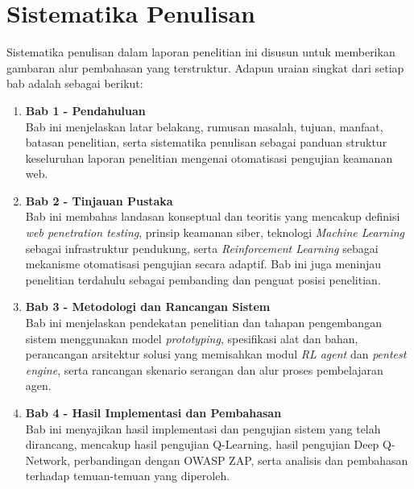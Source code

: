 \section{Sistematika Penulisan}

Sistematika penulisan dalam laporan penelitian ini disusun untuk memberikan gambaran alur pembahasan yang terstruktur. Adapun uraian singkat dari setiap bab adalah sebagai berikut:

\begin{enumerate}
    \item \textbf{Bab 1 - Pendahuluan} \\
    Bab ini menjelaskan latar belakang, rumusan masalah, tujuan, manfaat, batasan penelitian, serta sistematika penulisan sebagai panduan struktur keseluruhan laporan penelitian mengenai otomatisasi pengujian keamanan web.

    \item \textbf{Bab 2 - Tinjauan Pustaka} \\
    Bab ini membahas landasan konseptual dan teoritis yang mencakup definisi \textit{web penetration testing}, prinsip keamanan siber, teknologi \textit{Machine Learning} sebagai infrastruktur pendukung, serta \textit{Reinforcement Learning} sebagai mekanisme otomatisasi pengujian secara adaptif. Bab ini juga meninjau penelitian terdahulu sebagai pembanding dan penguat posisi penelitian.

    \item \textbf{Bab 3 - Metodologi dan Rancangan Sistem} \\
    Bab ini menjelaskan pendekatan penelitian dan tahapan pengembangan sistem menggunakan model \textit{prototyping}, spesifikasi alat dan bahan, perancangan arsitektur solusi yang memisahkan modul \textit{RL agent} dan \textit{pentest engine}, serta rancangan skenario serangan dan alur proses pembelajaran agen.

    \item \textbf{Bab 4 - Hasil Implementasi dan Pembahasan} \\
    Bab ini menyajikan hasil implementasi dan pengujian sistem yang telah dirancang, mencakup hasil pengujian Q-Learning, hasil pengujian Deep Q-Network, perbandingan dengan OWASP ZAP, serta analisis dan pembahasan terhadap temuan-temuan yang diperoleh.
\end{enumerate}